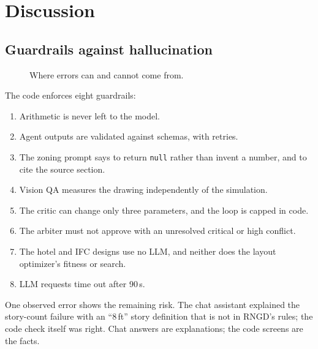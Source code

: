 \documentclass[10pt,a4paper]{article}
\newcommand{\code}[1]{\texttt{\small #1}}
\theoremstyle{definition}
\begin{document}
\section{Discussion}
\label{sec:discussion}

\subsection{Guardrails against hallucination}
\begin{figure}[H]
\centering
{}
\caption{Where errors can and cannot come from.}
\end{figure}

The code enforces eight guardrails:
\begin{enumerate}
\item Arithmetic is never left to the model.
\item Agent outputs are validated against schemas, with retries.
\item The zoning prompt says to return \code{null} rather than invent a number, and to cite the source section.
\item Vision QA measures the drawing independently of the simulation.
\item The critic can change only three parameters, and the loop is capped in code.
\item The arbiter must not approve with an unresolved critical or high conflict.
\item The hotel and IFC designs use no LLM, and neither does the layout optimizer's fitness or search.
\item LLM requests time out after 90\,s.
\end{enumerate}
One observed error shows the remaining risk. The chat assistant explained the story-count failure with an ``8\,ft''
story definition that is not in RNGD's rules; the code check itself was right. Chat answers are explanations; the code
screens are the facts.
\end{document}
